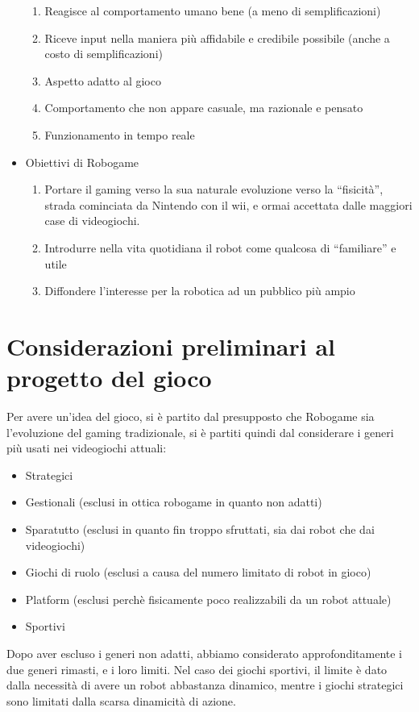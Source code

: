 \begin{itemize}
\begin{enumerate}
\item Reagisce al comportamento umano bene (a meno di semplificazioni)
\item Riceve input nella maniera più affidabile e credibile possibile (anche a costo di semplificazioni)
\item Aspetto adatto al gioco
\item Comportamento che non appare casuale, ma razionale e pensato
\item Funzionamento in tempo reale
\end{enumerate}
\item Obiettivi di Robogame
\begin{enumerate}
\item Portare il gaming verso la sua naturale evoluzione verso la “fisicità”, strada cominciata da Nintendo con il wii, e ormai accettata dalle maggiori case di videogiochi.
\item Introdurre nella vita quotidiana il robot come qualcosa di “familiare” e utile
\item Diffondere l’interesse per la robotica ad un pubblico più ampio
\end{enumerate}
\end{itemize}

\section{Considerazioni preliminari al progetto del gioco}
Per avere un’idea del gioco, si è partito dal presupposto che Robogame sia l’evoluzione del gaming tradizionale, si è partiti quindi dal considerare i generi più usati nei videogiochi attuali:
\begin{itemize}
\item Strategici
\item Gestionali (esclusi in ottica robogame in quanto non adatti)
\item Sparatutto (esclusi in quanto fin troppo sfruttati, sia dai robot che dai videogiochi)
\item Giochi di ruolo (esclusi a causa del numero limitato di robot in gioco)
\item Platform (esclusi perchè fisicamente poco realizzabili da un robot attuale)
\item Sportivi
\end{itemize}
Dopo aver escluso i generi non adatti, abbiamo considerato approfonditamente i due generi rimasti, e i loro limiti. Nel caso dei giochi sportivi, il limite è dato dalla necessità di avere un robot abbastanza dinamico, mentre i giochi strategici sono limitati dalla scarsa dinamicità di azione.

